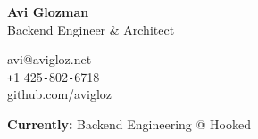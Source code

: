 \documentclass[10pt,oneside,final]{article}
\begin{document}
	\pagestyle{empty}	
	\begin{flushleft}	
		{\huge \textbf{Avi Glozman}}\\
		{\large Backend Engineer \& Architect\\}
		\vspace{2mm}
		\begin{leftli}
			{\large avi@avigloz.net}\\
			\vspace{0.2cm}
			{\large \texttt{+}1 425\texttt{-}802\texttt{-}6718}\\
			\vspace{0.2cm}
			{\large github.com/avigloz }
		\end{leftli}
		\vspace{-2.7cm}
		\begin{flushright}
		\end{flushright}    
		\vfill
		{\footnotesize \textbf{Currently:} Backend Engineering @ Hooked}
	\end{flushleft}
\end{document}
